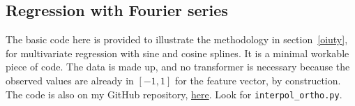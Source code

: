 \documentclass[oneside,10pt]{book}
\begin{document}
\subsection{Regression with Fourier series}\label{orthofou}

The basic code here is provided to illustrate the methodology in section~\ref{oiuty}, for multivariate regression with sine and cosine splines. It is a minimal workable piece of code. The
 data is made up, and no transformer is necessary because the observed values are already in $[-1,1]$ for the feature vector, by construction. The code is also
 on my GitHub repository, 
\href{https://github.com/VincentGranville/Statistical-Optimization/blob/main/interpol_ortho.py}{here}.
 Look for \texttt{interpol\_ortho.py}. \vspace{1ex}
\end{document}
